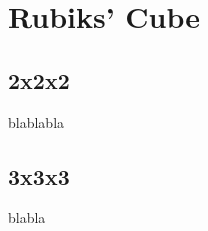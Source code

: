 
\chapter{Rubiks' Cube} %

\label{Chapter5} %


\section{2x2x2}

blablabla

\section{3x3x3}

blabla
